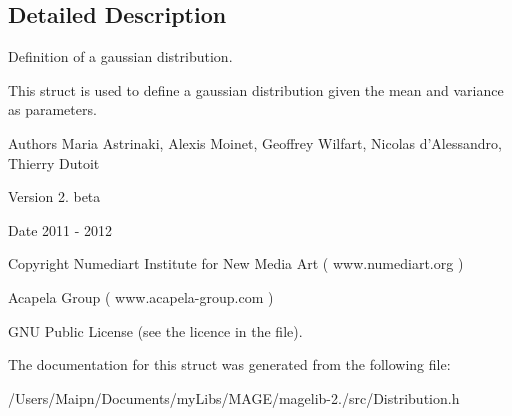 \subsection{Detailed Description}
Definition of a gaussian distribution. 

This struct is used to define a gaussian distribution given the mean and variance as parameters.

\begin{DoxyAuthor}{Authors}
Maria Astrinaki, Alexis Moinet, Geoffrey Wilfart, Nicolas d'Alessandro, Thierry Dutoit
\end{DoxyAuthor}
\begin{DoxyVersion}{Version}
2. beta 
\end{DoxyVersion}
\begin{DoxyDate}{Date}
2011 -\/ 2012 
\end{DoxyDate}
\begin{DoxyCopyright}{Copyright}
Numediart Institute for New Media Art ( www.\-numediart.\-org ) \par
 Acapela Group ( www.\-acapela-\/group.\-com ) \par
 G\-N\-U Public License (see the licence in the file). 
\end{DoxyCopyright}


The documentation for this struct was generated from the following file\-:\begin{DoxyCompactItemize}
\item 
/\-Users/\-Maipn/\-Documents/my\-Libs/\-M\-A\-G\-E/magelib-\/2./src/Distribution.\-h\end{DoxyCompactItemize}

